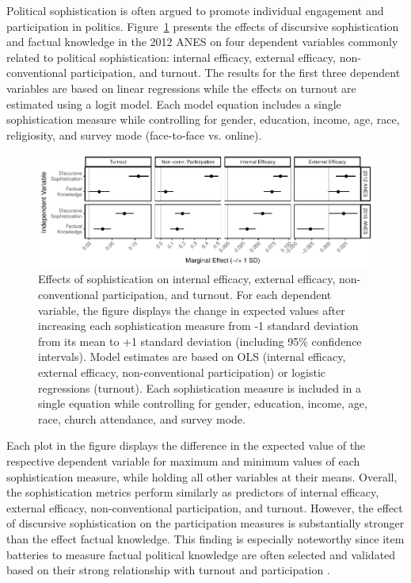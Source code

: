 \documentclass[12pt]{article}
\begin{document}
Political sophistication is often argued to promote individual engagement and participation in politics. Figure~\ref{fig:knoweff} presents the effects of discursive sophistication and factual knowledge in the 2012 ANES on four dependent variables commonly related to political sophistication: internal efficacy, external efficacy, non-conventional participation, and turnout. The results for the first three dependent variables are based on linear regressions while the effects on turnout are estimated using a logit model. Each model equation includes a single sophistication measure while controlling for gender, education, income, age, race, religiosity, and survey mode (face-to-face vs. online). 

\begin{figure}[h]\centering
\includegraphics{../fig/knoweff_pres.pdf}
\caption{Effects of sophistication on internal efficacy, external efficacy, non-conventional participation, and turnout. For each dependent variable, the figure displays the change in expected values after increasing each sophistication measure from -1 standard deviation from its mean to +1 standard deviation (including 95\% confidence intervals). Model estimates are based on OLS (internal efficacy, external efficacy, non-conventional participation) or logistic regressions (turnout). Each sophistication measure is included in a single equation while controlling for gender, education, income, age, race, church attendance, and survey mode.
}\label{fig:knoweff}
\end{figure}

Each plot in the figure displays the difference in the expected value of the respective dependent variable for maximum and minimum values of each sophistication measure, while holding all other variables at their means. Overall, the sophistication metrics perform similarly as predictors of internal efficacy, external efficacy, non-conventional participation, and turnout. However, the effect of discursive sophistication on the participation measures is substantially stronger than the effect factual knowledge. This finding is especially noteworthy since item batteries to measure factual political knowledge are often selected and validated based on their strong relationship with turnout and participation \citep[c.f.,][]{lupia2015uninformed}. 
\end{document}
